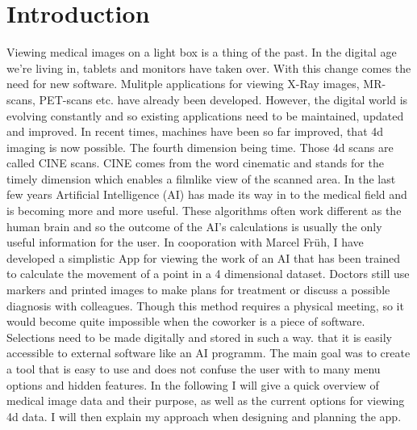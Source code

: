 
\chapter{Introduction}\label{Introduction}
Viewing medical images on a light box is a thing of the past. In the digital age we're living in, tablets and monitors have taken over. With this change comes the need for new software. Mulitple applications for viewing X-Ray images, MR-scans, PET-scans etc. have already been developed. However, the digital world is evolving constantly and so existing applications need to be maintained, updated and improved. In recent times, machines have been so far improved, that 4d imaging is now possible. The fourth dimension being time. Those 4d scans are called CINE scans. CINE comes from the word cinematic and stands for the timely dimension which enables a filmlike view of the scanned area.
In the last few years Artificial Intelligence (AI) has made its way in to the medical field and is becoming more and more useful. These algorithms often work different as the human brain and so the outcome of the AI's calculations is usually the only useful information for the user.
In cooporation with Marcel Früh, I have developed a simplistic App for viewing the work of an AI that has been trained to calculate the movement of a point in a 4 dimensional dataset. Doctors still use markers and printed images to make plans for treatment or discuss a possible diagnosis with colleagues. Though this method requires a physical meeting, so it would become quite impossible when the coworker is a piece of software. Selections need to be made digitally and stored in such a way. that it is easily accessible to external software like an AI programm. The main goal was to create a tool that is easy to use and does not confuse the user with to many menu options and hidden features. In the following I will give a quick overview of medical image data and their purpose, as well as the current options for viewing 4d data. I will then explain my approach when designing and planning the app. 
